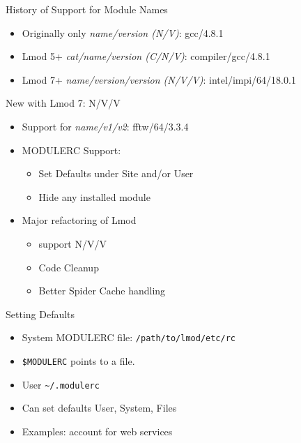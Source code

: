 \documentclass{beamer}
\begin{document}
\begin{frame}{History of Support for Module Names}
  \begin{itemize}
    \item Originally only \emph{name/version (N/V)}:  gcc/4.8.1
    \item Lmod 5+ \emph{cat/name/version (C/N/V)}:  compiler/gcc/4.8.1
    \item Lmod 7+ \emph{name/version/version (N/V/V)}: intel/impi/64/18.0.1
  \end{itemize}
\end{frame}

\begin{frame}{New with Lmod 7: N/V/V}
  \begin{itemize}
    \item Support for \emph{name/v1/v2}:  fftw/64/3.3.4
    \item MODULERC Support:
      \begin{itemize}
        \item Set Defaults under Site and/or User
        \item Hide any installed module
      \end{itemize}
    \item Major refactoring of Lmod 
      \begin{itemize}
        \item support N/V/V
        \item Code Cleanup
        \item Better Spider Cache handling
      \end{itemize}
  \end{itemize}
\end{frame}

\begin{frame}{Setting Defaults}
  \begin{itemize}
    \item System MODULERC file: \texttt{/path/to/lmod/etc/rc}
    \item \texttt{\$MODULERC} points to a file.
    \item User \texttt{\textasciitilde/.modulerc}
    \item Can set defaults User, System, Files
    \item Examples: account for web services
  \end{itemize}
\end{frame}
\end{document}
